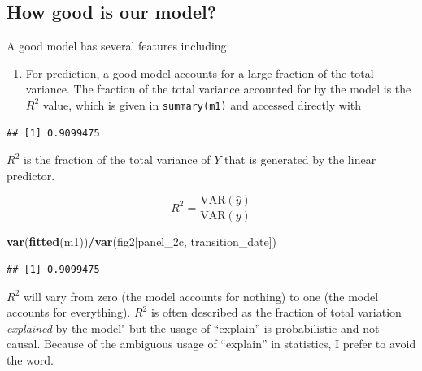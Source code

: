 \documentclass[]{book}
\newenvironment{Shaded}{\begin{snugshade}}{\end{snugshade}}
\newcommand{\KeywordTok}[1]{\textcolor[rgb]{0.13,0.29,0.53}{\textbf{#1}}}
\newcommand{\NormalTok}[1]{#1}
\newcommand{\OperatorTok}[1]{\textcolor[rgb]{0.81,0.36,0.00}{\textbf{#1}}}
\providecommand{\tightlist}{%
  \setlength{\itemsep}{0pt}\setlength{\parskip}{0pt}}
\begin{document}
\hypertarget{how-good-is-our-model}{%
\subsection{How good is our model?}\label{how-good-is-our-model}}

A good model has several features including

\begin{enumerate}
\def\labelenumi{\arabic{enumi}.}
\tightlist
\item
  For prediction, a good model accounts for a large fraction of the total variance. The fraction of the total variance accounted for by the model is the \(R^2\) value, which is given in \texttt{summary(m1)} and accessed directly with
\end{enumerate}

\begin{Shaded}
\end{Shaded}

\begin{verbatim}
## [1] 0.9099475
\end{verbatim}

\(R^2\) is the fraction of the total variance of \(Y\) that is generated by the linear predictor.

\begin{equation}
R^2 = \frac{\mathrm{VAR}(\hat{y})}{\mathrm{VAR}(y)}
\end{equation}

\begin{Shaded}
\begin{Highlighting}[]
\KeywordTok{var}\NormalTok{(}\KeywordTok{fitted}\NormalTok{(m1))}\OperatorTok{/}\KeywordTok{var}\NormalTok{(fig2[panel_2c, transition_date])}
\end{Highlighting}
\end{Shaded}

\begin{verbatim}
## [1] 0.9099475
\end{verbatim}

\(R^2\) will vary from zero (the model accounts for nothing) to one (the model accounts for everything). \(R^2\) is often described as the fraction of total variation \emph{explained} by the model" but the usage of ``explain'' is probabilistic and not causal. Because of the ambiguous usage of ``explain'' in statistics, I prefer to avoid the word.
\end{document}

